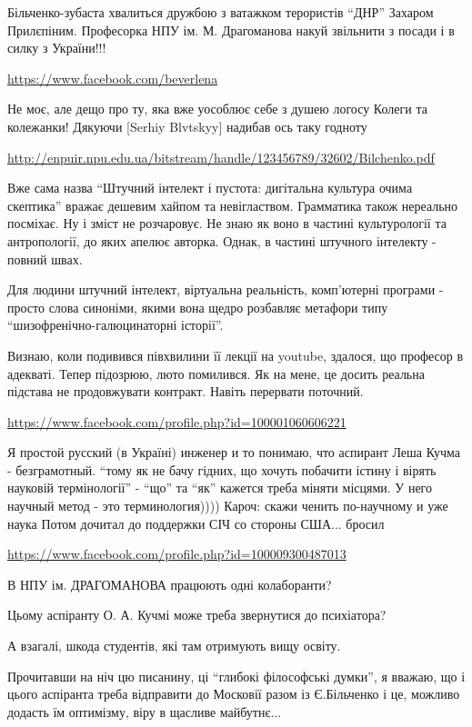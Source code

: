 \begin{itemize}
Більченко-зубаста хвалиться дружбою з ватажком терористів \enquote{ДНР} Захаром
Прилєпіним. Професорка НПУ ім. М. Драгоманова накуй звільнити з посади і в
силку з України!!!

\url{https://www.facebook.com/beverlena}

Не моє, але дещо про ту, яка вже уособлює себе з душею логосу Колеги та колежанки!
Дякуючи [Serhiy Blvtskyy] надибав ось таку годноту

\url{http://enpuir.npu.edu.ua/bitstream/handle/123456789/32602/Bilchenko.pdf}

Вже сама назва \enquote{Штучний інтелект і пустота: дигітальна культура очима
скептика} вражає дешевим хайпом та невіглаством. Грамматика також нереально
посміхає.  Ну і зміст не розчаровує. Не знаю як воно в частині культурології та
антропології, до яких апелює авторка. Однак, в частині штучного інтелекту -
повний швах.

Для людини штучний інтелект, віртуальна реальність, комп'ютерні програми -
просто слова синоніми, якими вона щедро розбавляє метафори типу
\enquote{шизофренічно-галюцинаторні історії}.

Визнаю, коли подивився півхвилини її лекції на youtube, здалося, що професор в
адекваті. Тепер підозрюю, люто помилився.  Як на мене, це досить реальна
підстава не продовжувати контракт. Навіть перервати поточний.

\url{https://www.facebook.com/profile.php?id=100001060606221}

Я простой русский (в Україні) инженер и то понимаю, что аспирант Леша Кучма -
безграмотный.  \enquote{тому як не бачу гідних, що хочуть побачити істину і
вірять науковій термінології} - \enquote{що} та \enquote{як} кажется треба
міняти місцями.  У него научный метод - это терминология)))) Кароч: скажи
ченить по-научному и уже наука Потом дочитал до поддержки СІЧ со стороны США...
бросил

\url{https://www.facebook.com/profile.php?id=100009300487013}

В НПУ ім. ДРАГОМАНОВА працюють одні колаборанти?

Цьому аспіранту О. А. Кучмі може треба звернутися до психіатора?

А взагалі, шкода студентів, які там отримують вищу освіту.

Прочитавши на ніч цю писанину, ці \enquote{глибокі філософські думки}, я
вважаю, що і цього аспіранта треба відправити до Московії разом із Є.Більченко
і це, можливо додасть їм оптимізму, віру в щасливе майбутнє...


\end{itemize}
